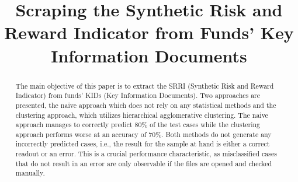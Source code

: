 \documentclass[aodsor,preprint]{imsart}
\numberwithin{equation}{section}
\theoremstyle{plain}
\begin{document}
\begin{frontmatter}
\title{Scraping the Synthetic Risk and Reward Indicator from Funds' Key Information Documents}

\begin{aug}
\author{\snm{}}





\end{aug}

\begin{abstract}
The main objective of this paper is to extract the SRRI (Synthetic Risk and Reward Indicator) from funds' KIDs (Key Information Documents). Two approaches are presented, the naive approach which does not rely on any statistical methods and the clustering approach, which utilizes hierarchical agglomerative clustering. The naive approach manages to correctly predict 80\% of the test cases while the clustering approach performs worse at an accuracy of 70\%. Both methods do not generate any incorrectly predicted cases, i.e., the result for the sample at hand is either a correct readout or an error. This is a crucial performance characteristic, as misclassified cases that do not result in an error are only observable if the files are opened and checked manually.
\end{abstract}

\begin{keyword}[class=MSC]
\end{keyword}

\begin{keyword}
\kwd{\LaTeXe}
\end{keyword}

\end{frontmatter}
\end{document}
